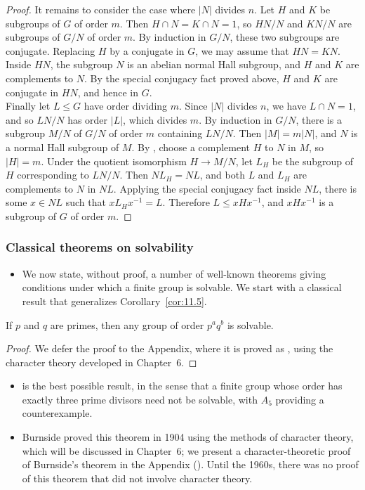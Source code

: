 \documentclass[../Odyssey_Project.tex]{subfiles}
\begin{document}
\begin{proof}
    It remains to consider the case where $\lvert N\rvert$ divides $n$. Let $H$ and $K$ be subgroups of $G$ of order $m$. Then $H\cap N=K\cap N=1$, so $HN/N$ and $KN/N$ are subgroups of $G/N$ of order $m$. By induction in $G/N$, these two subgroups are conjugate. Replacing $H$ by a conjugate in $G$, we may assume that $HN=KN$. Inside $HN$, the subgroup $N$ is an abelian normal Hall subgroup, and $H$ and $K$ are complements to $N$. By the special conjugacy fact proved above, $H$ and $K$ are conjugate in $HN$, and hence in $G$.\\
    Finally let $L\leq G$ have order dividing $m$. Since $\lvert N\rvert$ divides $n$, we have $L\cap N=1$, and so $LN/N$ has order $\lvert L\rvert$, which divides $m$. By induction in $G/N$, there is a subgroup $M/N$ of $G/N$ of order $m$ containing $LN/N$. Then $\lvert M\rvert=m\lvert N\rvert$, and $N$ is a normal Hall subgroup of $M$. By , choose a complement $H$ to $N$ in $M$, so $\lvert H\rvert=m$. Under the quotient isomorphism $H\to M/N$, let $L_H$ be the subgroup of $H$ corresponding to $LN/N$. Then $NL_H=NL$, and both $L$ and $L_H$ are complements to $N$ in $NL$. Applying the special conjugacy fact inside $NL$, there is some $x\in NL$ such that $xL_Hx^{-1}=L$. Therefore $L\leq xHx^{-1}$, and $xHx^{-1}$ is a subgroup of $G$ of order $m$.
\end{proof}

\subsubsection*{Classical theorems on solvability}
\begin{itemize}
    \item We now state, without proof, a number of well-known theorems giving conditions under which a finite group is solvable. We start with a classical result that generalizes Corollary~\ref{cor:11.5}.
\end{itemize}

\begin{namedtheorem}
\label{thm:burnside-solvable}
If $p$ and $q$ are primes, then any group of order $p^a q^b$ is solvable.
\end{namedtheorem}
\begin{proof}
    We defer the proof to the Appendix, where it is proved as , using the character theory developed in Chapter~6.
\end{proof}

\begin{itemize}
    \item {} is the best possible result, in the sense that a finite group whose order has exactly three prime divisors need not be solvable, with $A_5$ providing a counterexample.
    \item Burnside proved this theorem in 1904 using the methods of character theory, which will be discussed in Chapter~6; we present a character-theoretic proof of Burnside's theorem in the Appendix (). Until the 1960s, there was no proof of this theorem that did not involve character theory.
\end{itemize}
\end{document}
